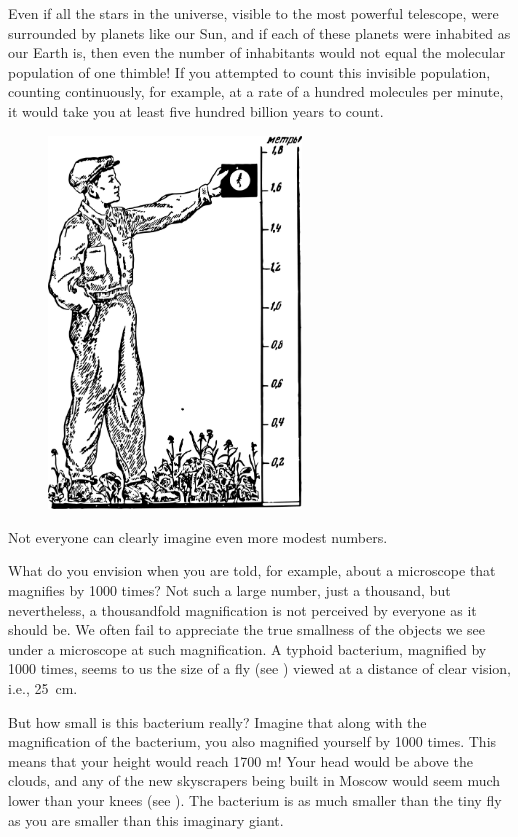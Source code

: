 Even if all the stars in the universe, visible to the most powerful telescope, were surrounded by planets like our Sun, and if each of these planets were inhabited as our Earth is, then even the number of inhabitants would not equal the molecular population of one thimble! If you attempted to count this invisible population, counting continuously, for example, at a rate of a hundred molecules per minute, it would take you at least five hundred billion years to count.

\begin{figure}[h!]
\centering
\includegraphics[width=0.6\textwidth]{figures/ch-11/fig-160.pdf}
\end{figure}

Not everyone can clearly imagine even more modest numbers.

What do you envision when you are told, for example, about a microscope that magnifies by 1000 times? Not such a large number, just a thousand, but nevertheless, a thousandfold magnification is not perceived by everyone as it should be. We often fail to appreciate the true smallness of the objects we see under a microscope at such magnification. A typhoid bacterium, magnified by 1000 times, seems to us the size of a fly (see ) viewed at a distance of clear vision, i.e., \SI{25}{\centi\meter}. 


But how small is this bacterium really? Imagine that along with the magnification of the bacterium, you also magnified yourself by 1000 times. This means that your height would reach 1700 m! Your head would be above the clouds, and any of the new skyscrapers being built in Moscow would seem much lower than your knees (see ). The bacterium is as much smaller than the tiny fly as you are smaller than this imaginary giant.

